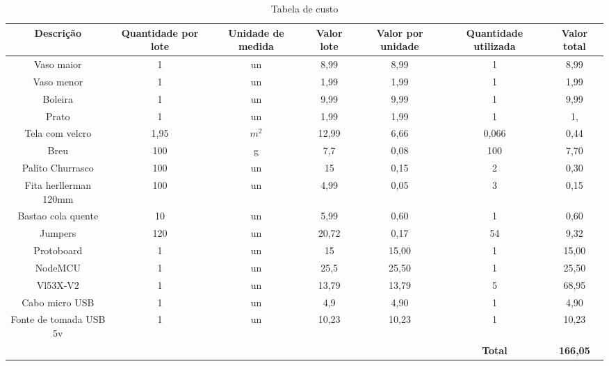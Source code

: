 \documentclass[
	12pt,				%
	openright,			%
	oneside,			%
	a4paper,			%
	chapter=TITLE,		%
	english,			%
	brazil				%
	]{abntex2}
\begin{document}
\begin{center}     
        \begin{table}[H]
            \caption{Tabela de custo}
            \label{tab:custos} 
            \begin{adjustbox}{width=\textwidth}  
        \begin{tabular}{ |c|c|c|c|c|c|c| }                           
            \hline
            \rowcolor{lightgray} \textbf{Descrição} & \textbf{Quantidade por lote} & \textbf{Unidade de medida} & \textbf{Valor lote} & \textbf{Valor por unidade} & \textbf{Quantidade utilizada} & \textbf{Valor total} \\
            \hline
            Vaso maior & 1 & un & 8,99 & 8,99 & 1 & 8,99 \\
            \hline
            Vaso menor & 1 & un & 1,99 & 1,99 & 1 & 1,99 \\
            \hline
            Boleira & 1 & un & 9,99 & 9,99 & 1 & 9,99 \\
            \hline
            Prato & 1 & un & 1,99 & 1,99 & 1 & 1, \\
            \hline
            Tela com velcro & 1,95 & $m^{2}$ & 12,99 & 6,66 & 0,066 & 0,44 \\
            \hline
            Breu & 100 & g & 7,7 & 0,08 & 100 & 7,70 \\
            \hline
            Palito Churrasco & 100 & un & 15 & 0,15 & 2 & 0,30 \\
            \hline
            Fita herllerman 120mm & 100 & un & 4,99 & 0,05 & 3 & 0,15 \\
            \hline
            Bastao cola quente & 10 & un & 5,99 & 0,60 & 1 & 0,60 \\
            \hline
            Jumpers & 120 & un & 20,72 & 0,17 & 54 & 9,32 \\
            \hline
            Protoboard & 1 & un & 15 & 15,00 & 1 & 15,00 \\
            \hline
            NodeMCU & 1 & un & 25,5 & 25,50 & 1 & 25,50 \\
            \hline
            Vl53X-V2 & 1 & un & 13,79 & 13,79 & 5 & 68,95 \\
            \hline
            Cabo micro USB & 1 & un & 4,9 & 4,90 & 1 & 4,90 \\
            \hline
            Fonte de tomada USB 5v & 1 & un & 10,23 & 10,23 & 1 & 10,23 \\
            \hline           
            &  &  &  &  & \textbf{Total} & \textbf{166,05} \\
            \hline
        \end{tabular}  
    \end{adjustbox}
    \end{table}    
\end{center}
\end{document}
